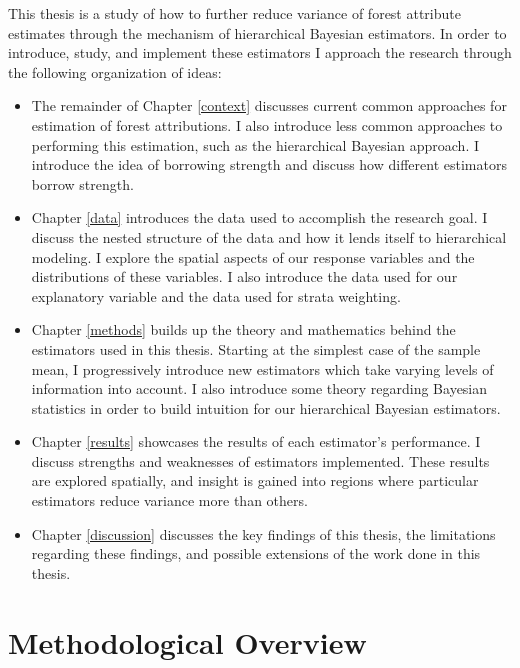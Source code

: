 \documentclass[12pt,twoside]{reedthesis}
\providecommand{\tightlist}{%
  \setlength{\itemsep}{0pt}\setlength{\parskip}{0pt}}
\begin{document}
This thesis is a study of how to further reduce variance of forest attribute estimates through the mechanism of hierarchical Bayesian estimators. In order to introduce, study, and implement these estimators I approach the research through the following organization of ideas:
\begin{itemize}
\tightlist
\item
  The remainder of Chapter \ref{context} discusses current common approaches for estimation of forest attributions. I also introduce less common approaches to performing this estimation, such as the hierarchical Bayesian approach. I introduce the idea of borrowing strength and discuss how different estimators borrow strength.
\item
  Chapter \ref{data} introduces the data used to accomplish the research goal. I discuss the nested structure of the data and how it lends itself to hierarchical modeling. I explore the spatial aspects of our response variables and the distributions of these variables. I also introduce the data used for our explanatory variable and the data used for strata weighting.
\item
  Chapter \ref{methods} builds up the theory and mathematics behind the estimators used in this thesis. Starting at the simplest case of the sample mean, I progressively introduce new estimators which take varying levels of information into account. I also introduce some theory regarding Bayesian statistics in order to build intuition for our hierarchical Bayesian estimators.
\item
  Chapter \ref{results} showcases the results of each estimator's performance. I discuss strengths and weaknesses of estimators implemented. These results are explored spatially, and insight is gained into regions where particular estimators reduce variance more than others.
\item
  Chapter \ref{discussion} discusses the key findings of this thesis, the limitations regarding these findings, and possible extensions of the work done in this thesis.
\end{itemize}
\hypertarget{methodological-overview}{%
\section{Methodological Overview}\label{methodological-overview}}
\end{document}
